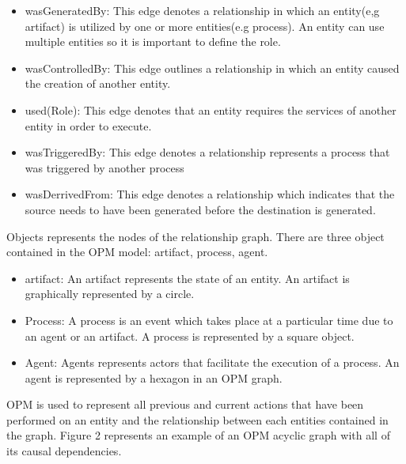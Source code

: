 \begin{itemize}
\item wasGeneratedBy: This edge denotes a  relationship in which an entity(e,g artifact) is utilized by one or  more entities(e.g process). An entity can use multiple entities so it is important to define the role.  
\item wasControlledBy: This edge outlines a relationship in which an entity caused the creation of another entity.
\item used(Role): This edge denotes that an entity requires the services of another entity in order to execute.
\item wasTriggeredBy: This edge denotes a relationship represents a process that was triggered by another process
\item wasDerrivedFrom: This edge denotes a relationship which indicates that the source needs to have been generated before the destination is generated.
\end{itemize}

 Objects represents the nodes of the relationship graph. There are three object contained in the OPM model: artifact, process, agent. 

\begin{itemize}
\item
artifact: An artifact represents the state of an entity. An artifact is graphically represented by a circle.

\item
Process: A process is an event which takes place at a particular time due to an agent or an artifact. A process is represented by a square object.

\item 
Agent: Agents represents actors that facilitate the execution of a process. An agent is represented by a hexagon in an OPM graph.
\end{itemize}

OPM is used to represent all previous and current actions that have been performed on an entity and  the relationship between each entities contained in the graph. Figure 2 represents an example of an OPM acyclic graph with all of its causal dependencies.  

